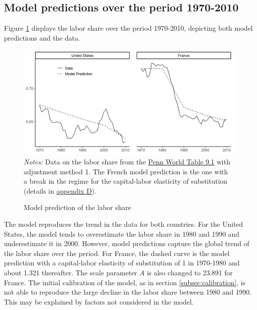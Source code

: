 \subsection{Model predictions over the period 1970-2010}\label{subsec:model_pred}

Figure \ref{fig:baseline7010} displays the labor share over the period 1970-2010, depicting both model predictions and the data.
\begin{figure}[tb]
	\centering
	\caption{Model prediction of the labor share} \label{fig:baseline7010}
	\includegraphics[width=1\linewidth]{../result/baseline7010.png}
	\vspace{-6ex}
	\justify\singlespacing\footnotesize \textit{Notes:} Data on the labor share from the \href{https://www.rug.nl/ggdc/productivity/pwt/}{Penn World Table 9.1} with adjustment method 1. The French model prediction is the one with a break in the regime for the capital-labor elasticity of substitution (details in \hyperref[appendix:regime]{appendix D}).
\end{figure}
The model reproduces the trend in the data for both countries. 
For the United States, the model tends to overestimate the labor share in 1980 and 1990 and underestimate it in 2000.
However, model predictions capture the global trend of the labor share over the period.
For France, the dashed curve is the model prediction with a capital-labor elasticity of substitution of 1 in 1970-1980 and about 1.321 thereafter. The scale parameter $A$ is also changed to 23.891 for France. The initial calibration of the model, as in section \ref{subsec:calibration}, is not able to reproduce the large decline in the labor share between 1980 and 1990. This may be explained by factors not considered in the model.
